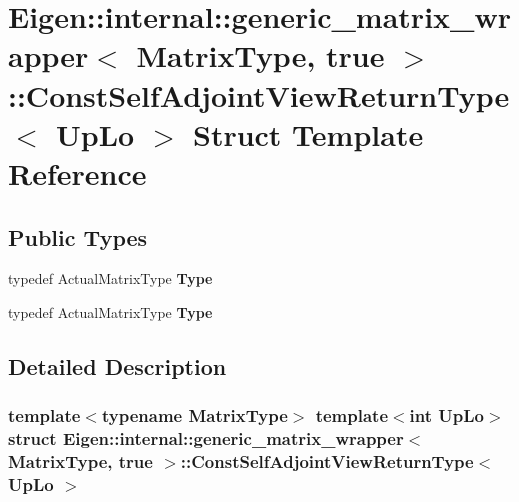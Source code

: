 \hypertarget{struct_eigen_1_1internal_1_1generic__matrix__wrapper_3_01_matrix_type_00_01true_01_4_1_1_const_self_adjoint_view_return_type}{}\section{Eigen\+:\+:internal\+:\+:generic\+\_\+matrix\+\_\+wrapper$<$ Matrix\+Type, true $>$\+:\+:Const\+Self\+Adjoint\+View\+Return\+Type$<$ Up\+Lo $>$ Struct Template Reference}
\label{struct_eigen_1_1internal_1_1generic__matrix__wrapper_3_01_matrix_type_00_01true_01_4_1_1_const_self_adjoint_view_return_type}
\subsection*{Public Types}
\begin{DoxyCompactItemize}
\item 
\mbox{\label{struct_eigen_1_1internal_1_1generic__matrix__wrapper_3_01_matrix_type_00_01true_01_4_1_1_const_self_adjoint_view_return_type_a1be9ca02c8eb212030b2239d6b12da23}} 
typedef Actual\+Matrix\+Type {\bfseries Type}
\item 
\mbox{\label{struct_eigen_1_1internal_1_1generic__matrix__wrapper_3_01_matrix_type_00_01true_01_4_1_1_const_self_adjoint_view_return_type_a1be9ca02c8eb212030b2239d6b12da23}} 
typedef Actual\+Matrix\+Type {\bfseries Type}
\end{DoxyCompactItemize}


\subsection{Detailed Description}
\subsubsection*{template$<$typename Matrix\+Type$>$\newline
template$<$int Up\+Lo$>$\newline
struct Eigen\+::internal\+::generic\+\_\+matrix\+\_\+wrapper$<$ Matrix\+Type, true $>$\+::\+Const\+Self\+Adjoint\+View\+Return\+Type$<$ Up\+Lo $>$}



